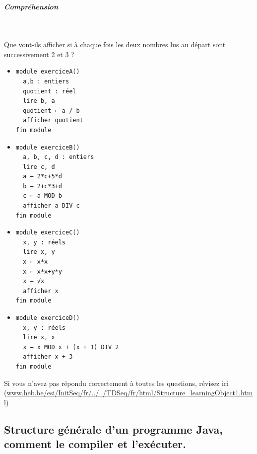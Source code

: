 \documentclass[11pt,a4paper]{article}
\begin{document}
			
		\subparagraph{Compr\'ehension} 
		
                \textcolor{white}{.} \par
            
							  Que vont-ils afficher si \`a chaque fois les deux nombres lus au d\'epart sont successivement 2 et 3 ?
							
					\begin{itemize}
				
			\item \begin{verbatim}
module exerciceA()
  a,b : entiers
  quotient : réel
  lire b, a
  quotient ← a / b
  afficher quotient
fin module
				\end{verbatim} \textcolor{gray}{\underline{\hspace*{2em}}} 
			\item \begin{verbatim}
module exerciceB()
  a, b, c, d : entiers
  lire c, d
  a ← 2*c+5*d
  b ← 2+c*3+d
  c ← a MOD b
  afficher a DIV c
fin module
				\end{verbatim} \textcolor{gray}{\underline{\hspace*{1em}}} 
			\item \begin{verbatim}
module exerciceC()
  x, y : réels
  lire x, y
  x ← x*x 
  x ← x*x+y*y 
  x ← √x
  afficher x
fin module
				\end{verbatim} \textcolor{gray}{\underline{\hspace*{1em}}} 
			\item \begin{verbatim}
module exerciceD()
  x, y : réels
  lire x, x
  x ← x MOD x + (x + 1) DIV 2
  afficher x + 3
fin module
				\end{verbatim} \textcolor{gray}{\underline{\hspace*{1em}}} 
					\end{itemize}
				
            \par
        Si vous n'avez pas r\'epondu correctement \`a toutes les questions, 
        r\'evisez ici (\url{www.heb.be/esi/InitSeq/fr/../../TDSeq/fr/html/Structure\_learningObject1.html})
            \par
        \subsection{Structure g\'en\'erale d'un programme Java, comment le compiler et l'ex\'ecuter.}
			
\end{document}
